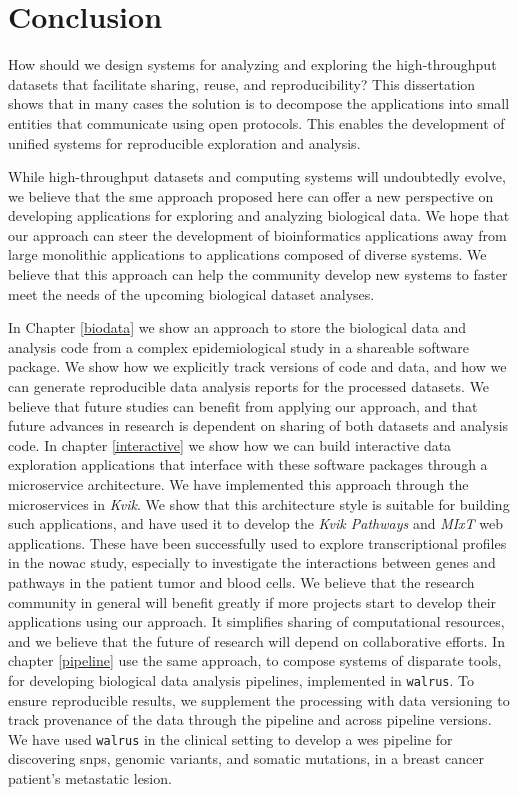 \chapter{Conclusion}
How should we design systems for analyzing and exploring the high-throughput
datasets that facilitate sharing, reuse, and reproducibility? This dissertation
shows that in many cases the solution is to decompose the applications into
small entities that communicate using open protocols. This enables the
development of unified systems for reproducible exploration and analysis. 

While high-throughput datasets and computing systems will undoubtedly evolve, we
believe that the \gls{sme} approach proposed here can offer a new perspective on
developing applications for exploring and analyzing biological data. We hope
that our approach can steer the development of bioinformatics applications away
from large monolithic applications to applications composed of diverse systems.
We believe that this approach can help the community develop new systems to
faster meet the needs of the upcoming biological dataset analyses. 

In Chapter \ref{biodata} we show an approach to store the biological data and
analysis code from a complex epidemiological study in a shareable software
package. We show how we explicitly track versions of code and data, and how we
can generate reproducible data analysis reports for the processed datasets.
We believe that future studies can benefit from applying our approach, and that
future advances in research is dependent on sharing of both datasets and
analysis code. 
In chapter \ref{interactive} we show how we can build
interactive data exploration applications that interface with these software
packages through a microservice architecture. We have implemented this approach
through the microservices in \emph{Kvik}. We show that this architecture style
is suitable for building such applications, and have used it to develop the
\emph{Kvik Pathways} and \emph{MIxT} web applications. These have been
successfully used to explore transcriptional profiles in the \gls{nowac} study,
especially to investigate the interactions between genes and pathways in the
patient tumor and blood cells. 
We believe that the research community in general will benefit greatly if more
projects start to develop their applications using our approach. It simplifies
sharing of computational resources, and we believe that the future of research
will depend on collaborative efforts. 
In chapter \ref{pipeline} use the same approach, to compose systems of disparate
tools, for developing biological data
analysis pipelines, implemented in \texttt{walrus}. 
To ensure reproducible results, we supplement the processing
with data versioning to track provenance of the data through the pipeline and
across pipeline versions. We have used \texttt{walrus} in the clinical setting
to develop a \gls{wes} pipeline for discovering \glspl{snp}, genomic
variants, and somatic mutations, in a breast cancer patient's metastatic
lesion. 

